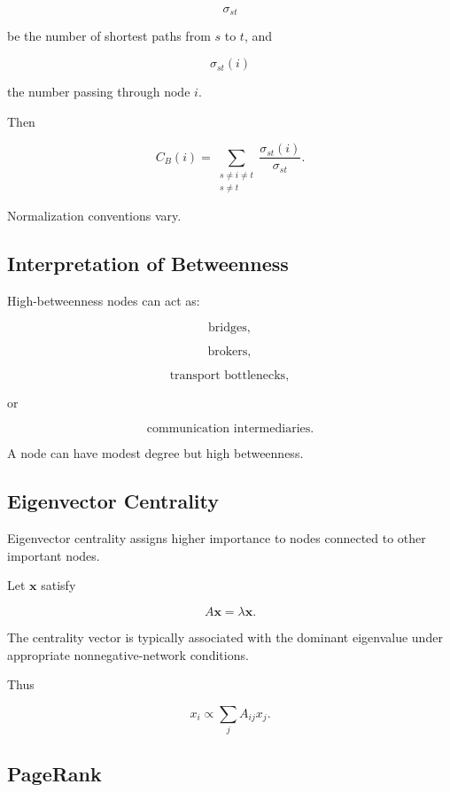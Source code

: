 \[
\sigma_{st}
\]

be the number of shortest paths from \(s\) to \(t\), and

\[
\sigma_{st}(i)
\]

the number passing through node \(i\).

Then

\[
\boxed{
C_B(i)
=
\sum_{\substack{s\neq i\neq t\\s\neq t}}
\frac{\sigma_{st}(i)}
{\sigma_{st}}.
}
\]

Normalization conventions vary.

\subsection{Interpretation of Betweenness}
\label{subsec:betweenness-interpretation}

High-betweenness nodes can act as:

\[
\boxed{
\text{bridges},
}
\]

\[
\boxed{
\text{brokers},
}
\]

\[
\boxed{
\text{transport bottlenecks},
}
\]

or

\[
\boxed{
\text{communication intermediaries}.
}
\]

A node can have modest degree but high betweenness.

\subsection{Eigenvector Centrality}
\label{subsec:eigenvector-centrality}

Eigenvector centrality assigns higher importance to nodes connected to other
important nodes.

Let \(\mathbf{x}\) satisfy

\[
\boxed{
A\mathbf{x}
=
\lambda\mathbf{x}.
}
\]

The centrality vector is typically associated with the dominant eigenvalue
under appropriate nonnegative-network conditions.

Thus

\[
\boxed{
x_i
\propto
\sum_jA_{ij}x_j.
}
\]

\subsection{PageRank}
\label{subsec:pagerank}

